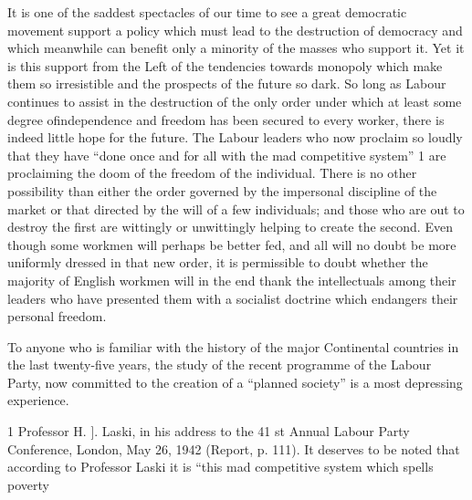 \documentclass[11pt,openany]{book}
\begin{document}
It is one of the saddest spectacles of our time to see a great democratic movement support a policy which must lead to the destruction of democracy and which meanwhile can benefit only a minority of the masses who support it. Yet it is this support from the Left of the tendencies towards monopoly which make them so irresistible and the prospects of the future so dark. So long as Labour continues to assist in the destruction of the only order under which at least some degree ofindependence and freedom has been secured to every worker, there is indeed little hope for the future. The Labour leaders who now proclaim so loudly that they have ``done once and for all with the mad competitive system'' 1 are proclaiming the doom of the freedom of the individual. There is no other possibility than either the order governed by the impersonal discipline of the market or that directed by the will of a few individuals; and those who are out to destroy the first are wittingly or unwittingly helping to create the second. Even though some workmen will perhaps be better fed, and all will no doubt be more uniformly dressed in that new order, it is permissible to doubt whether the majority of English workmen will in the end thank the intellectuals among their leaders who have presented them with a socialist doctrine which endangers their personal freedom.

To anyone who is familiar with the history of the major Continental countries in the last twenty-five years, the study of the recent programme of the Labour Party, now committed to the creation of a ``planned society'' is a most depressing experience.

1 Professor H. ]. Laski, in his address to the 41 st Annual Labour Party Conference, London, May 26, 1942 (Report, p. 111). It deserves to be noted that according to Professor Laski it is ``this mad competitive system which spells poverty
\end{document}
